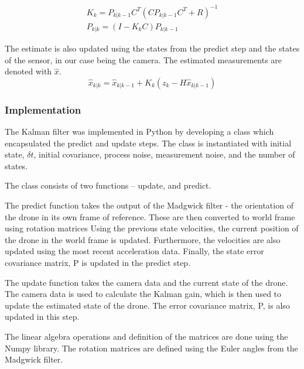 \documentclass[bare_jrnl_transmag]{subfiles}
\begin{document}
\begin{eqnarray*}
    K_k = P_{k|k-1} C^T (C P_{k|k-1} C^T + R)^{-1} \\[1em]
    P_{k|k} = (I - K_k C) P_{k|k-1}
\end{eqnarray*}

The estimate is also updated using the states from the predict step and the states of the sensor, in our case being the camera. 
The estimated measurements are denoted with $\hat{x}$. 
\begin{equation*}
    \hat{x}_{k|k} = \hat{x}_{k|k-1} + K_k (z_k - H \hat{x}_{k|k-1})
\end{equation*}

\subsubsection{Implementation}

The Kalman filter was implemented in Python by developing a class which encapsulated the predict and update steps. The class is instantiated with initial state, $\delta t$, initial covariance, process noise, measurement noise, and the number of states. 

The class consists of two functions -- update, and predict.\newline

The predict function takes the output of the Madgwick filter - the orientation of the drone in its own frame of reference. These are then converted to world frame using rotation matrices Using the previous state velocities, the current position of the drone in the world frame is updated. Furthermore, the velocities are also updated using the most recent acceleration data. Finally, the state error covariance matrix, P is updated in the predict step. \newline

The update function takes the camera data and the current state of the drone. The camera data is used to calculate the Kalman gain, which is then used to update the estimated state of the drone. The error covariance matrix, P, is also updated in this step.\newline

The linear algebra operations and definition of the matrices are done using the Numpy library. The rotation matrices are defined using the Euler angles from the Madgwick filter. 
\end{document}
